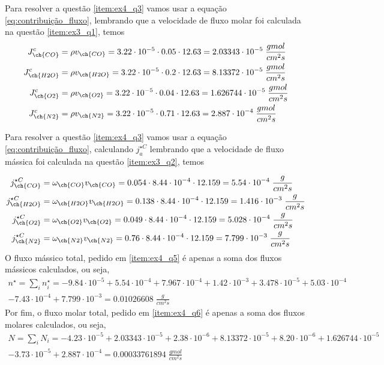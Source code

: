 Para resolver a questão \ref{item:ex4_q3} vamos usar a equação \ref{eq:contribuição_fluxo},
lembrando que a velocidade de fluxo molar foi calculada na questão \ref{item:ex3_q1}, temos
\begin{align}
    J_{\ch{CO}} ^{c} &= \rho v_{\ch{CO}} = 3.22 \cdot 10^{-5} \cdot 0.05 \cdot 12.63  = 2.03343 \cdot 10^{-5} \; \frac{gmol}{cm^{2} s}\\
    J_{\ch{H2O}} ^{c} &= \rho v_{\ch{H2O}} = 3.22 \cdot 10^{-5} \cdot 0.2 \cdot 12.63 = 8.13372 \cdot 10^{-5}  \; \frac{gmol}{cm^{2} s}\\
    J_{\ch{O2}} ^{c} &= \rho v_{\ch{O2}} = 3.22 \cdot 10^{-5} \cdot 0.04 \cdot 12.63  = 1.626744 \cdot 10^{-5} \; \frac{gmol}{cm^{2} s}\\
    J_{\ch{N2}} ^{c} &= \rho v_{\ch{N2}} = 3.22 \cdot 10^{-5} \cdot 0.71 \cdot 12.63 = 2.887\cdot 10^{-4}   \; \frac{gmol}{cm^{2} s}
\end{align}

Para resolver a questão \ref{item:ex4_q3} vamos usar a equação \ref{eq:contribuição_fluxo},
calculando \(j_a ^{\star C} \) lembrando que a velocidade de fluxo mássica foi calculada na questão
\ref{item:ex3_q2}, temos

\begin{align}
    j_{\ch{CO}} ^{\star C} &= \omega_{\ch{CO}} v_{\ch{CO}} = 0.054 \cdot 8.44 \cdot 10^{-4}  \cdot 12.159 = 5.54\cdot 10^{-4}    \; \frac{g}{cm^{2} s}\\
    j_{\ch{H2O}} ^{\star C} &= \omega_{\ch{H2O}} v_{\ch{H2O}} = 0.138 \cdot 8.44 \cdot 10^{-4} \cdot 12.159 = 1.416\cdot 10^{-3}  \; \frac{g}{cm^{2} s}\\
    j_{\ch{O2}} ^{\star C} &= \omega_{\ch{O2}} v_{\ch{O2}} = 0.049 \cdot 8.44 \cdot 10^{-4} \cdot 12.159 = 5.028\cdot 10^{-4}    \; \frac{g}{cm^{2} s}\\
    j_{\ch{N2}} ^{\star C} &= \omega_{\ch{N2}} v_{\ch{N2}} = 0.76 \cdot 8.44 \cdot 10^{-4} \cdot 12.159 = 7.799 \cdot 10^{-3}  \; \frac{g}{cm^{2} s}
\end{align}
O fluxo mássico total, pedido em \ref{item:ex4_q5} é apenas a soma dos fluxos mássicos calculados, ou seja,
\begin{align}
    n^{\star} = \sum_{i} n_i ^{\star}  = -9.84\cdot 10^{-5} + 5.54 \cdot 10^{-4} + 7.967 \cdot 10^{-4} + 1.42 \cdot 10^{-3}  + 3.478 \cdot 10^{-5} + 5.03 \cdot 10^{-4}\\
    - 7.43 \cdot 10^{-4}  + 7.799 \cdot 10^{-3} = 0.01026608 \; \frac{g}{cm^{2} s}
\end{align}
Por fim, o fluxo molar total, pedido em \ref{item:ex4_q6} é apenas a soma dos fluxos molares
calculados, ou seja,
\begin{align}
    N = \sum_{i} N_i  = -4.23 \cdot 10^{-5} + 2.03343 \cdot 10^{-5} + 2.38 \cdot 10^{-6} + 8.13372 \cdot 10^{-5} + 8.20 \cdot 10^{-6} + 1.626744 \cdot 10^{-5}\\
    - 3.73 \cdot 10^{-5} + 2.887 \cdot 10^{-4}  = 0.00033761894 \; \frac{gmol}{cm^{2} s}
\end{align}
